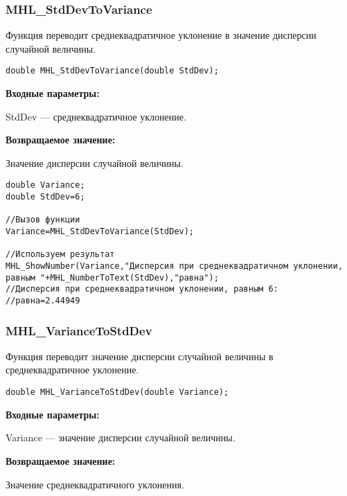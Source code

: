 \documentclass[a4paper,12pt]{article}
\begin{document}
\subsubsection{MHL\_StdDevToVariance}\label{MHL_StdDevToVariance}

Функция переводит среднеквадратичное уклонение в значение дисперсии случайной величины.


\begin{lstlisting}[label=code_syntax_MHL_StdDevToVariance,caption=Синтаксис]
double MHL_StdDevToVariance(double StdDev);
\end{lstlisting}

\textbf{Входные параметры:}

 StdDev --- среднеквадратичное уклонение.

\textbf{Возвращаемое значение:}

 Значение дисперсии случайной величины.



\begin{lstlisting}[label=code_use_MHL_StdDevToVariance,caption=Пример использования]
double Variance;
double StdDev=6;

//Вызов функции
Variance=MHL_StdDevToVariance(StdDev);

//Используем результат
MHL_ShowNumber(Variance,"Дисперсия при среднеквадратичном уклонении, равным "+MHL_NumberToText(StdDev),"равна");
//Дисперсия при среднеквадратичном уклонении, равным 6:
//равна=2.44949
\end{lstlisting}

\subsubsection{MHL\_VarianceToStdDev}\label{MHL_VarianceToStdDev}

Функция переводит значение дисперсии случайной величины в среднеквадратичное уклонение.


\begin{lstlisting}[label=code_syntax_MHL_VarianceToStdDev,caption=Синтаксис]
double MHL_VarianceToStdDev(double Variance);
\end{lstlisting}

\textbf{Входные параметры:}

 Variance --- значение дисперсии случайной величины.

\textbf{Возвращаемое значение:}

 Значение среднеквадратичного уклонения.
\end{document}
